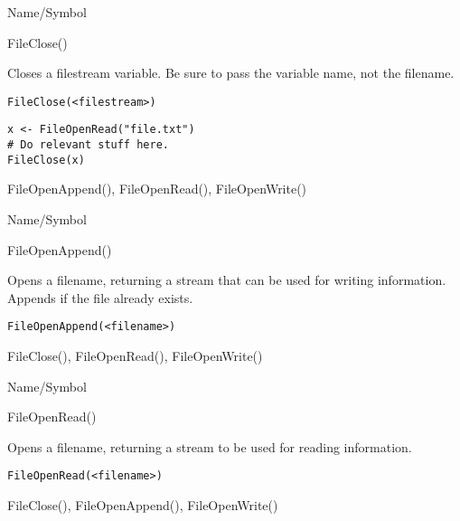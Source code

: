 \begin{desc}{Name/Symbol}
\item[Name/Symbol]	FileClose()

\item[Description]	Closes a filestream  variable.  Be sure to 
		pass the variable name, not the filename.  

\item[Usage]
\begin{verbatim}
FileClose(<filestream>)
\end{verbatim}

\item[Example]
\begin{verbatim}
x <- FileOpenRead("file.txt")
# Do relevant stuff here.
FileClose(x)
\end{verbatim}

\item[See Also]	FileOpenAppend(), FileOpenRead(), FileOpenWrite()
\end{desc}

\rl




\begin{desc}{Name/Symbol}
\item[Name/Symbol]	FileOpenAppend()

\item[Description]	Opens a filename, returning  a stream that can be used for 
		writing information.  Appends if the file already exists.

\item[Usage]
\begin{verbatim}
FileOpenAppend(<filename>)
\end{verbatim}

\item[Example]	

\item[See Also]	FileClose(), FileOpenRead(), FileOpenWrite()
\end{desc}

\rl



\begin{desc}{Name/Symbol}
\item[Name/Symbol]	FileOpenRead()

\item[Description]  	Opens a filename, returning  a stream to be used 
		for reading information.

\item[Usage]
\begin{verbatim}
FileOpenRead(<filename>)
\end{verbatim}

\item[Example]	

\item[See Also]	FileClose(), FileOpenAppend(), FileOpenWrite()
\end{desc}

